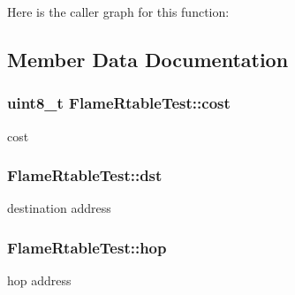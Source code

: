 Here is the caller graph for this function\+:




\subsection{Member Data Documentation}
\subsubsection[{\texorpdfstring{cost}{cost}}]{\setlength{\rightskip}{0pt plus 5cm}uint8\+\_\+t Flame\+Rtable\+Test\+::cost\hspace{0.3cm}{\ttfamily [private]}}\hypertarget{classFlameRtableTest_a1532ba6fc14e6e181b0394895293e201}{}\label{classFlameRtableTest_a1532ba6fc14e6e181b0394895293e201}


cost 

\subsubsection[{\texorpdfstring{dst}{dst}}]{ Flame\+Rtable\+Test\+::dst\hspace{0.3cm}{\ttfamily [private]}}\hypertarget{classFlameRtableTest_a879be62e9afb8a1709d1b1b162114e47}{}\label{classFlameRtableTest_a879be62e9afb8a1709d1b1b162114e47}


destination address 

\subsubsection[{\texorpdfstring{hop}{hop}}]{ Flame\+Rtable\+Test\+::hop\hspace{0.3cm}{\ttfamily [private]}}\hypertarget{classFlameRtableTest_a5ffa683ad6877934d8dd1ab4ce5f67fb}{}\label{classFlameRtableTest_a5ffa683ad6877934d8dd1ab4ce5f67fb}


hop address 

